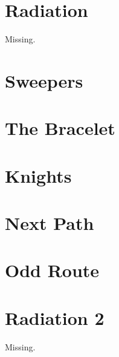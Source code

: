 \documentclass[a4paper, 10pt]{article}
\let\stdsection\section
\renewcommand\section{\newpage\stdsection}
\newcommand{\includecode}[1]{
    }
\begin{document}
    \section{Radiation}
        Missing.
        
    \section{Sweepers}
        \includecode{../problems/w12/Sweepers/Sweepers1.cpp}
        
    \section{The Bracelet}
        \includecode{../problems/w12/The_Bracelet/Bracelet1.cpp}
        
    
    \section{Knights}
        \includecode{../problems/w13/Knights/Knights1.cpp}
        
    \section{Next Path}
        \includecode{../problems/w13/NextPath/NextPath1.cpp}
        
    \section{Odd Route}
        \includecode{../problems/w13/OddRoute/OddRoute1.cpp}
        
    \section{Radiation 2}
        Missing.
    
\end{document}
